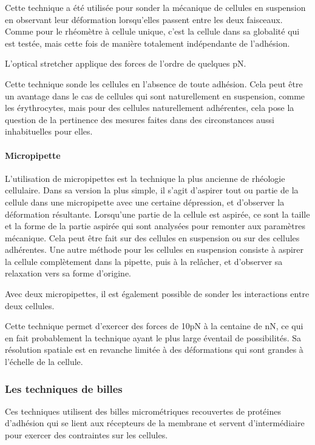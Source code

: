\documentclass{report}
\begin{document}
Cette technique a été utilisée pour sonder la mécanique de cellules en suspension en observant leur déformation lorsqu'elles passent entre les deux faisceaux. 
Comme pour le rhéomètre à cellule unique, c'est la cellule dans sa globalité qui est testée, mais cette fois de manière totalement indépendante de l'adhésion. 

L'optical stretcher applique des forces de l'ordre de quelques pN. 

Cette technique sonde les cellules en l'absence de toute adhésion. Cela peut être un avantage dans le cas de cellules qui sont naturellement en suspension, comme les érythrocytes, mais pour des cellules naturellement adhérentes, cela pose la question de la pertinence des mesures faites dans des circonstances aussi inhabituelles pour elles. 

\paragraph{Micropipette}

L'utilisation de micropipettes est la technique la plus ancienne de rhéologie cellulaire. 
Dans sa version la plus simple, il s'agit d'aspirer tout ou partie de la cellule dans une micropipette avec une certaine dépression, et d'observer la déformation résultante. 
Lorsqu'une partie de la cellule est aspirée, ce sont la taille et la forme de la partie aspirée qui sont analysées pour remonter aux paramètres mécanique. 
Cela peut être fait sur des cellules en suspension ou sur des cellules adhérentes.
Une autre méthode pour les cellules en suspension consiste à aspirer la cellule complètement dans la pipette, puis à la relâcher, et d'observer sa relaxation vers sa forme d'origine. 

 
Avec deux micropipettes, il est également possible de sonder les interactions entre deux cellules. 

Cette technique permet d'exercer des forces de 10pN à la centaine de nN, ce qui en fait probablement la technique ayant le plus large éventail de possibilités. Sa résolution spatiale est en revanche limitée à des déformations qui sont grandes à l'échelle de la cellule. 



\subsubsection{Les techniques de billes}
Ces techniques utilisent des billes micrométriques recouvertes de protéines d'adhésion qui se lient aux récepteurs de la membrane et servent d'intermédiaire pour exercer des contraintes sur les cellules. 
\end{document}

